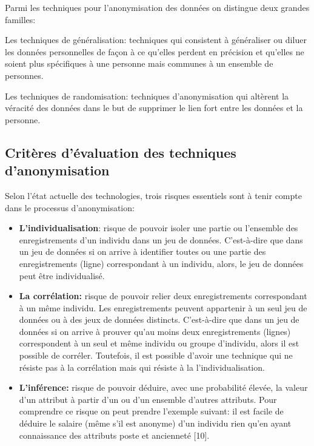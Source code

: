 Parmi les techniques pour l’anonymisation des données on distingue deux grandes familles:  

Les techniques de généralisation: techniques qui consistent à généraliser ou diluer les données personnelles de façon à ce qu’elles perdent en précision et qu’elles ne soient plus spécifiques à une personne mais communes à un ensemble de personnes. 

Les techniques de randomisation:  techniques d’anonymisation qui altèrent la véracité des données dans le but de supprimer le lien fort entre les données et la personne. 

\subsection{Critères d’évaluation des techniques d’anonymisation}

Selon l’état actuelle des technologies, trois risques essentiels sont à tenir compte dans le processus d’anonymisation:  

\begin{itemize}
 
    \item \textbf{L’individualisation}: risque de pouvoir isoler une partie ou l’ensemble des enregistrements d’un individu dans un jeu de données. C’est-à-dire que dans un jeu de données si on arrive à identifier toutes ou une partie des enregistrements (ligne) correspondant à un individu, alors, le jeu de données peut être individualisé. 

    \item \textbf{La corrélation:} risque de pouvoir relier deux enregistrements correspondant à un même individu. Les enregistrements peuvent appartenir à un seul jeu de données ou à des jeux de données distincts. C’est-à-dire que dans un jeu de données si on arrive à prouver qu’au moins deux enregistrements (lignes) correspondent à un seul et même individu ou groupe d’individu, alors il est possible de corréler. Toutefois, il est possible d’avoir une technique qui ne résiste pas à la corrélation mais qui résiste à la l’individualisation.  

    \item \textbf{L’inférence:} risque de pouvoir déduire, avec une probabilité élevée, la valeur d’un attribut à partir d’un ou d’un ensemble d’autres attributs. Pour comprendre ce risque on peut prendre l’exemple suivant: il est facile de déduire le salaire (même s’il est anonyme) d’un individu rien qu’en ayant connaissance des attributs poste et ancienneté [10]. 
\end{itemize}